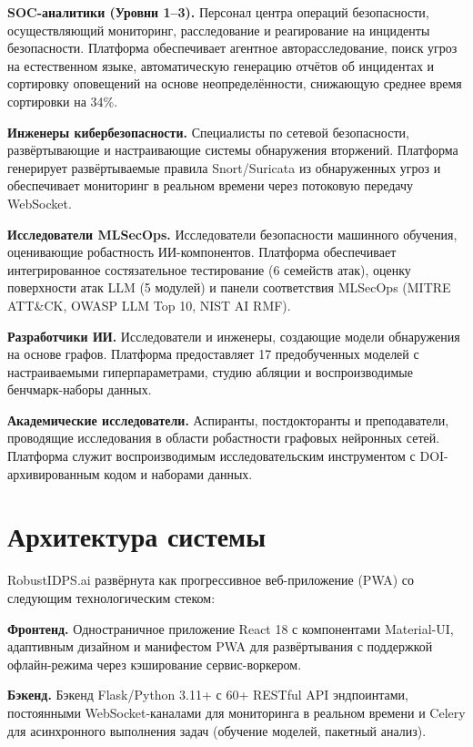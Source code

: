 \noindent\textbf{SOC-аналитики (Уровни 1--3).} Персонал центра операций безопасности, осуществляющий мониторинг, расследование и реагирование на инциденты безопасности. Платформа обеспечивает агентное авторасследование, поиск угроз на естественном языке, автоматическую генерацию отчётов об инцидентах и сортировку оповещений на основе неопределённости, снижающую среднее время сортировки на 34\%.

\noindent\textbf{Инженеры кибербезопасности.} Специалисты по сетевой безопасности, развёртывающие и настраивающие системы обнаружения вторжений. Платформа генерирует развёртываемые правила Snort/Suricata из обнаруженных угроз и обеспечивает мониторинг в реальном времени через потоковую передачу WebSocket.

\noindent\textbf{Исследователи MLSecOps.} Исследователи безопасности машинного обучения, оценивающие робастность ИИ-компонентов. Платформа обеспечивает интегрированное состязательное тестирование (6 семейств атак), оценку поверхности атак LLM (5 модулей) и панели соответствия MLSecOps (MITRE ATT\&CK, OWASP LLM Top 10, NIST AI RMF).

\noindent\textbf{Разработчики ИИ.} Исследователи и инженеры, создающие модели обнаружения на основе графов. Платформа предоставляет 17 предобученных моделей с настраиваемыми гиперпараметрами, студию абляции и воспроизводимые бенчмарк-наборы данных.

\noindent\textbf{Академические исследователи.} Аспиранты, постдокторанты и преподаватели, проводящие исследования в области робастности графовых нейронных сетей. Платформа служит воспроизводимым исследовательским инструментом с DOI-архивированным кодом и наборами данных.


\section{Архитектура системы}
\label{sec:system_arch}

RobustIDPS.ai развёрнута как прогрессивное веб-приложение (PWA) со следующим технологическим стеком:

\noindent\textbf{Фронтенд.} Одностраничное приложение React 18 с компонентами Material-UI, адаптивным дизайном и манифестом PWA для развёртывания с поддержкой офлайн-режима через кэширование сервис-воркером.

\noindent\textbf{Бэкенд.} Бэкенд Flask/Python 3.11+ с 60+ RESTful API эндпоинтами, постоянными WebSocket-каналами для мониторинга в реальном времени и Celery для асинхронного выполнения задач (обучение моделей, пакетный анализ).

